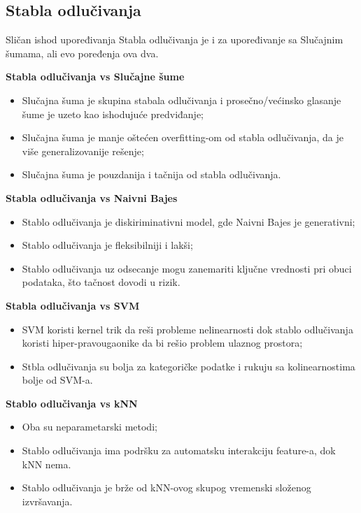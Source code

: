 \documentclass[fontsize=12bp, paper=a4]{scrarticle}
\begin{document}
\subsection{Stabla odlučivanja}
Sličan ishod upoređivanja Stabla odlučivanja je i za upoređivanje sa Slučajnim šumama, ali evo poređenja ova dva.

\textbf{Stabla odlučivanja vs Slučajne šume}
\begin{itemize}
    \item Slučajna šuma je skupina stabala odlučivanja i prosečno/većinsko glasanje šume je uzeto kao ishodujuće predviđanje;
    \item Slučajna šuma je manje oštećen overfitting-om od stabla odlučivanja, da je više generalizovanije rešenje;
    \item Slučajna šuma je pouzdanija i tačnija od stabla odlučivanja.
\end{itemize}

\textbf{Stabla odlučivanja vs Naivni Bajes}
\begin{itemize}
    \item Stablo odlučivanja je diskiriminativni model, gde Naivni Bajes je generativni;
    \item Stablo odlučivanja je fleksibilniji i lakši;
    \item Stablo odlučivanja uz odsecanje mogu zanemariti ključne vrednosti pri obuci podataka, što tačnost dovodi u rizik.
\end{itemize}

\textbf{Stabla odlučivanja vs SVM}
\begin{itemize}
    \item SVM koristi kernel trik da reši probleme nelinearnosti dok stablo odlučivanja koristi hiper-pravougaonike da bi rešio problem ulaznog prostora;
    \item Stbla odlučivanja su bolja za kategoričke podatke i rukuju sa kolinearnostima bolje od SVM-a.
\end{itemize}

\textbf{Stablo odlučivanja vs kNN}
\begin{itemize}
    \item Oba su neparametarski metodi;
    \item Stablo odlučivanja ima podršku za automatsku interakciju feature-a, dok kNN nema.
    \item Stablo odlučivanja je brže od kNN-ovog skupog vremenski složenog izvršavanja.
\end{itemize}
\end{document}
